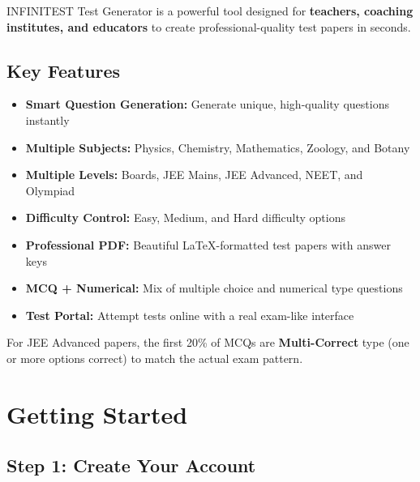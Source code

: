 \documentclass[11pt,a4paper]{article}
\begin{document}
INFINITEST Test Generator is a powerful tool designed for \textbf{teachers, coaching institutes, and educators} to create professional-quality test papers in seconds.

\subsection{Key Features}

\begin{itemize}[leftmargin=*]
    \item \textcolor{accent}{\faCheckCircle} \textbf{Smart Question Generation:} Generate unique, high-quality questions instantly
    \item \textcolor{accent}{\faCheckCircle} \textbf{Multiple Subjects:} Physics, Chemistry, Mathematics, Zoology, and Botany
    \item \textcolor{accent}{\faCheckCircle} \textbf{Multiple Levels:} Boards, JEE Mains, JEE Advanced, NEET, and Olympiad
    \item \textcolor{accent}{\faCheckCircle} \textbf{Difficulty Control:} Easy, Medium, and Hard difficulty options
    \item \textcolor{accent}{\faCheckCircle} \textbf{Professional PDF:} Beautiful LaTeX-formatted test papers with answer keys
    \item \textcolor{accent}{\faCheckCircle} \textbf{MCQ + Numerical:} Mix of multiple choice and numerical type questions
    \item \textcolor{accent}{\faCheckCircle} \textbf{Test Portal:} Attempt tests online with a real exam-like interface
\end{itemize}

\begin{tcolorbox}[notebox]
For JEE Advanced papers, the first 20\% of MCQs are \textbf{Multi-Correct} type (one or more options correct) to match the actual exam pattern.
\end{tcolorbox}

\section{Getting Started}

\subsection{Step 1: Create Your Account}
\end{document}
